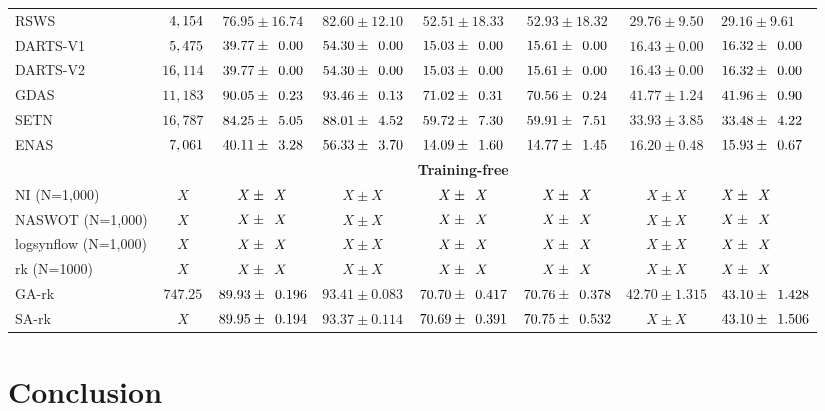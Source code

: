 \documentclass[sigconf]{acmart}
\begin{document}
\begin{table*}[htb]
\begin{tabular}{@{}lccccccl@{}}
        RSWS      & $\z{4,154}$  & $76.95 \pm 16.74$                & $82.60 \pm 12.10$               & $52.51 \pm 18.33$                & $52.93 \pm 18.32$                   & $29.76 \pm 9.50$                 & $29.16 \pm 9.61$               \\
        DARTS-V1  & $\z{5,475}$  & $39.77 \pm \z{0.00}$                & $54.30 \pm \z{0.00}$               & $15.03 \pm \z{0.00}$                 & $15.61 \pm \z{0.00}$                & $16.43 \pm 0.00$                 & $16.32 \pm \z{0.00}$                \\
        DARTS-V2  & $16,114$ & $39.77 \pm \z{0.00}$               & $54.30 \pm \z{0.00}$               & $15.03 \pm \z{0.00}$                & $15.61 \pm \z{0.00}$                   & $16.43 \pm 0.00$                 & $16.32 \pm \z{0.00}$                \\
        GDAS      & $11,183$ & $90.05 \pm \z{0.23}$                & $93.46 \pm \z{0.13}$               & $71.02 \pm \z{0.31}$                 & $70.56 \pm \z{0.24}$                & $41.77 \pm 1.24$                 & $41.96 \pm \z{0.90}$                \\
        SETN      & $16,787$ & $84.25 \pm \z{5.05}$                & $88.01 \pm \z{4.52}$               & $59.72 \pm \z{7.30}$                & $59.91 \pm \z{7.51}$                   & $33.93 \pm 3.85$                 & $33.48 \pm \z{4.22}$                \\
        ENAS      & $\z{7,061}$  & $40.11 \pm \z{3.28}$                & $56.33 \pm \z{3.70}$               & $14.09 \pm \z{1.60}$                 & $14.77 \pm \z{1.45}$                & $16.20 \pm 0.48$                 & $15.93 \pm \z{0.67}$                \\ \midrule
        &&&&\textbf{Training-free}&&&\\
        NI (N=1,000) & $X$ & $X\pm \z{X}$ & $X\pm X$ & $X\pm \z{X}$ & $X\pm \z{X}$ & $X\pm X$ & $X\pm \z{X}$ \\ 
        NASWOT (N=1,000) & $X$ & $X\pm \z{X}$ & $X\pm X$ & $X\pm \z{X}$ & $X\pm \z{X}$ & $X\pm X$ & $X\pm \z{X}$ \\ 
        logsynflow (N=1,000) & $X$ & $X\pm \z{X}$ & $X\pm X$ & $X\pm \z{X}$ & $X\pm \z{X}$ & $X\pm X$ & $X\pm \z{X}$ \\ 
        rk (N=1000) & $X$ & $X\pm \z{X}$ & $X\pm X$ & $X\pm \z{X}$ & $X\pm \z{X}$ & $X\pm X$ & $X\pm \z{X}$ \\ 
        GA-rk & $747.25$ & $89.93\pm \z{0.196}$ & $93.41\pm0.083$ & $70.70\pm \z{0.417}$ & $70.76\pm \z{0.378}$ & $42.70\pm 1.315$ & $43.10\pm \z{1.428}$ \\ 
        SA-rk & $X$ & $89.95\pm \z{0.194}$ & $93.37\pm0.114$ & $70.69\pm \z{0.391}$ & $70.75\pm \z{0.532}$ & $X\pm X$ & $43.10\pm \z{1.506}$ \\ \bottomrule
        \end{tabular}
        \label{table:overall_201}
          \vspace{-\baselineskip}
      \end{table*}
    
    \section{Conclusion}
    \label{sec:conclusion}

    
    
\end{document}
